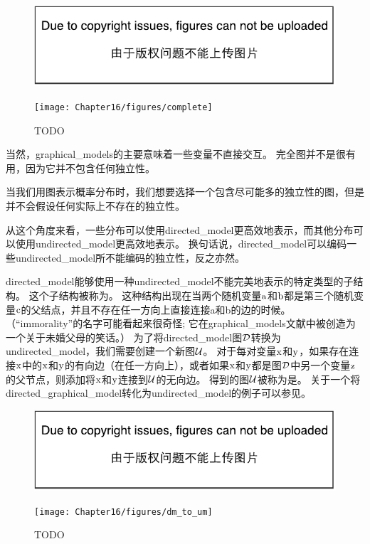 \begin{figure}[!htb]
\ifOpenSource
\centerline{\includegraphics{figure.pdf}}
\else
	\centerline{\texttt{[image: Chapter16/figures/complete]}}	
\fi
	\caption{TODO}
	\label{fig:complete}
\end{figure}


当然，\gls{graphical_models}的主要意味着一些变量不直接交互。 
完全图并不是很有用，因为它并不包含任何独立性。


当我们用图表示概率分布时，我们想要选择一个包含尽可能多的独立性的图，但是并不会假设任何实际上不存在的独立性。


从这个角度来看，一些分布可以使用\gls{directed_model}更高效地表示，而其他分布可以使用\gls{undirected_model}更高效地表示。
换句话说，\gls{directed_model}可以编码一些\gls{undirected_model}所不能编码的独立性，反之亦然。


\gls{directed_model}能够使用一种\gls{undirected_model}不能完美地表示的特定类型的子结构。
这个子结构被称为。
这种结构出现在当两个随机变量$\mathrm{a}$和$\mathrm{b}$都是第三个随机变量$\mathrm{c}$的父结点，并且不存在任一方向上直接连接a和b的边的时候。
（``\gls{immorality}''的名字可能看起来很奇怪; 它在\gls{graphical_models}文献中被创造为一个关于未婚父母的笑话。）
为了将\gls{directed_model}图$\mathcal{D}$转换为\gls{undirected_model}，我们需要创建一个新图$\mathcal{U}$。
对于每对变量$\mathrm{x}$和$\mathrm{y}$，如果存在连接$\mathrm{x}$中的$\mathrm{x}$和$\mathrm{y}$的有向边（在任一方向上），或者如果$\mathrm{x}$和$\mathrm{y}$都是图$\mathcal{D}$中另一个变量$\mathrm{z}$的父节点，则添加将$\mathrm{x}$和$\mathrm{y}$连接到$\mathcal{U}$的无向边。 
得到的图$\mathcal{U}$被称为是。
关于一个将\gls{directed_graphical_model}转化为\gls{undirected_model}的例子可以参见。


\begin{figure}[!htb]
\ifOpenSource
\centerline{\includegraphics{figure.pdf}}
\else
	\centerline{\texttt{[image: Chapter16/figures/dm\_to\_um]}}	
\fi
	\caption{TODO}
	\label{fig:dm_to_um}
\end{figure}



